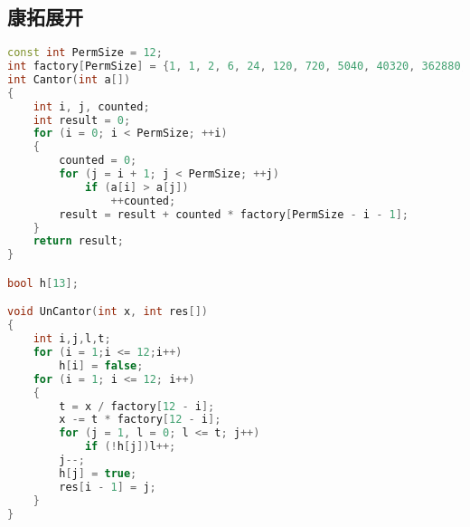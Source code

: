 \subsection{康拓展开}
	\begin{lstlisting}[language=c++]
const int PermSize = 12;
int factory[PermSize] = {1, 1, 2, 6, 24, 120, 720, 5040, 40320, 362880, 3628800, 39916800};
int Cantor(int a[])
{
	int i, j, counted;
	int result = 0;
	for (i = 0; i < PermSize; ++i)
	{
		counted = 0;
		for (j = i + 1; j < PermSize; ++j)
			if (a[i] > a[j])
				++counted;
		result = result + counted * factory[PermSize - i - 1];
	}
	return result;
}

bool h[13];

void UnCantor(int x, int res[])
{
	int i,j,l,t;
	for (i = 1;i <= 12;i++)
		h[i] = false;
	for (i = 1; i <= 12; i++)
	{
		t = x / factory[12 - i];
		x -= t * factory[12 - i];
		for (j = 1, l = 0; l <= t; j++)
			if (!h[j])l++;
		j--;
		h[j] = true;
		res[i - 1] = j;
	}
}
	\end{lstlisting}
